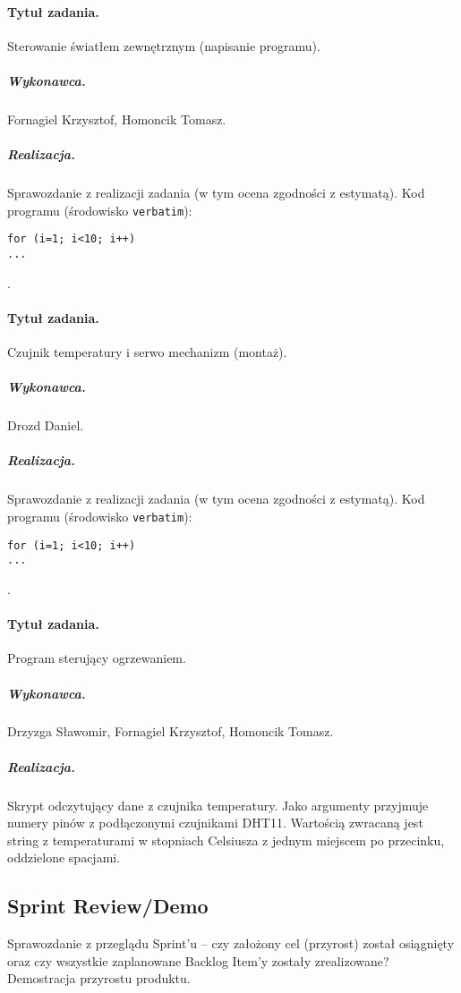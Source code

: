 \paragraph{Tytuł zadania.} Sterowanie światłem zewnętrznym (napisanie programu).
\subparagraph{Wykonawca.} Fornagiel Krzysztof, Homoncik Tomasz.
\subparagraph{Realizacja.} Sprawozdanie z realizacji zadania (w tym ocena zgodności z estymatą). Kod programu (środowisko \texttt{verbatim}): \begin{verbatim}
for (i=1; i<10; i++)
...
\end{verbatim}.

\paragraph{Tytuł zadania.} Czujnik temperatury i serwo mechanizm (montaż).
\subparagraph{Wykonawca.} Drozd Daniel.
\subparagraph{Realizacja.} Sprawozdanie z realizacji zadania (w tym ocena zgodności z estymatą). Kod programu (środowisko \texttt{verbatim}): \begin{verbatim}
for (i=1; i<10; i++)
...
\end{verbatim}.

\paragraph{Tytuł zadania.} Program sterujący ogrzewaniem.
\subparagraph{Wykonawca.} Drzyzga Sławomir, Fornagiel Krzysztof, Homoncik Tomasz.
\subparagraph{Realizacja.} Skrypt odczytujący dane z czujnika temperatury. Jako argumenty przyjmuje numery pinów z podłączonymi czujnikami DHT11. Wartością zwracaną jest string z temperaturami w stopniach Celsiusza z jednym miejscem po przecinku, oddzielone spacjami.



\subsection{Sprint Review/Demo}
Sprawozdanie z przeglądu Sprint'u -- czy założony cel (przyrost) został osiągnięty oraz czy wszystkie zaplanowane Backlog Item'y zostały zrealizowane? Demostracja przyrostu produktu.
